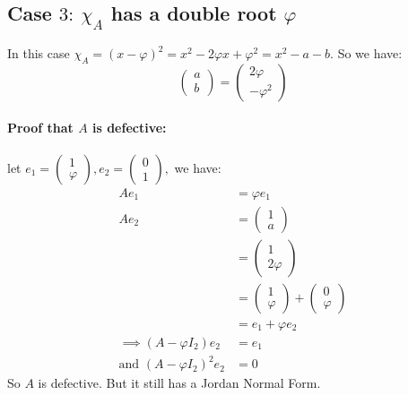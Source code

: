 \documentclass[]{article}
\begin{document}
\subsection{Case $3: \ \chi_A$ has a double root $\varphi$}
In this case $\chi_A=(x-\varphi)^2=x^2-2\varphi x +\varphi^2=x^2-a-b.$ 
\newline 
So we have:
$$
\begin{pmatrix}
	a \\ b
\end{pmatrix} = \begin{pmatrix}
2\varphi \\ -\varphi^2
\end{pmatrix}
$$
\newline
\paragraph{Proof that $A$ is defective: } let $e_1=\begin{pmatrix}
	1 \\ \varphi
\end{pmatrix},e_2=\begin{pmatrix}
	0 \\ 1
\end{pmatrix},$ we have:
\begin{align*}
	Ae_1&=\varphi e_1 \\
	Ae_2&=\begin{pmatrix}
		1 \\ a 
	\end{pmatrix} \\
&=\begin{pmatrix}
	1 \\ 2\varphi 
\end{pmatrix}\\
&=\begin{pmatrix}
	1 \\ \varphi 
\end{pmatrix}+\begin{pmatrix}
0 \\ \varphi  
\end{pmatrix} \\
&=e_1+\varphi e_2 \\ 
\implies (A-\varphi I_2)e_2 &= e_1 \\
\text{and } (A-\varphi I_2)^2e_2 &= 0
\end{align*}
So $A$ is defective. But it still has a Jordan Normal Form.
\end{document}
